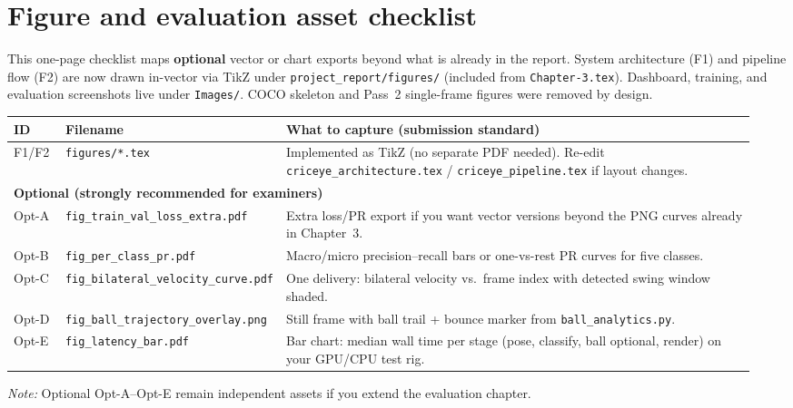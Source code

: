 \chapter*{Figure and evaluation asset checklist}

This one-page checklist maps \textbf{optional} vector or chart exports beyond what is already in the report. System architecture (F1) and pipeline flow (F2) are now drawn in-vector via TikZ under \texttt{project\_report/figures/} (included from \texttt{Chapter-3.tex}). Dashboard, training, and evaluation screenshots live under \texttt{Images/}. COCO skeleton and Pass~2 single-frame figures were removed by design.

\vspace{0.6em}
{\renewcommand{\arraystretch}{1.25}\small
\begin{tabular}{@{}p{0.07\linewidth}p{0.22\linewidth}p{0.66\linewidth}@{}}
\hline
\textbf{ID} & \textbf{Filename} & \textbf{What to capture (submission standard)} \\
\hline
F1/F2 & \texttt{figures/*.tex} & Implemented as TikZ (no separate PDF needed). Re-edit \texttt{criceye\_architecture.tex} / \texttt{criceye\_pipeline.tex} if layout changes. \\
\hline
\multicolumn{3}{l}{\textbf{Optional (strongly recommended for examiners)}} \\
\hline
Opt-A & \texttt{fig\_train\_val\_loss\_extra.pdf} & Extra loss/PR export if you want vector versions beyond the PNG curves already in Chapter~3. \\
Opt-B & \texttt{fig\_per\_class\_pr.pdf} & Macro/micro precision--recall bars or one-vs-rest PR curves for five classes. \\
Opt-C & \texttt{fig\_bilateral\_velocity\_curve.pdf} & One delivery: bilateral velocity vs.\ frame index with detected swing window shaded. \\
Opt-D & \texttt{fig\_ball\_trajectory\_overlay.png} & Still frame with ball trail + bounce marker from \texttt{ball\_analytics.py}. \\
Opt-E & \texttt{fig\_latency\_bar.pdf} & Bar chart: median wall time per stage (pose, classify, ball optional, render) on your GPU/CPU test rig. \\
\hline
\end{tabular}
}

\vspace{0.8em}
\noindent\textit{Note:} Optional Opt-A--Opt-E remain independent assets if you extend the evaluation chapter.
